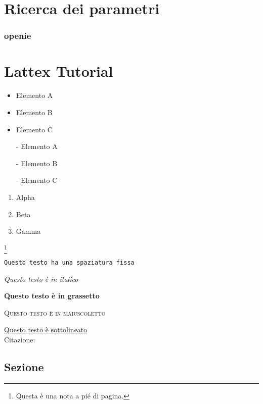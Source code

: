 \documentclass[twoside]{supsistudent}
\begin{document}
\chapter{Ricerca dei parametri}
\subsection{openie}

\chapter{Lattex Tutorial}
\lipsum[13]

\begin{itemize}
  \item Elemento A
  \item Elemento B
  \item Elemento C
\end{itemize}

\begin{itemize}
  \item[-] Elemento A
  \item[-] Elemento B
  \item[-] Elemento C
\end{itemize}

\begin{enumerate}
 \item Alpha
  \item Beta
  \item Gamma
\end{enumerate}

\footnote{Questa è una nota a pi\'e di pagina.}

\texttt{Questo testo ha una spaziatura fissa}

\textit{Questo testo \`e in italico}

\textbf{Questo testo \`e in grassetto}

\textsc{Questo testo \`e in maiuscoletto}

\underline{Questo testo \`e sottolineato} \\

Citazione:
\begin{quote}
\lipsum[23]
\end{quote}

\section{Sezione}
\end{document}

